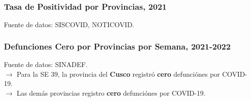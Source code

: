 \documentclass[xcolor=table]{beamer}
\begin{document}
	\begin{frame}
		\frametitle{Tasa de Positividad por Provincias, 2021}
		\vspace{-.5cm}
		
		\begin{table}[]
			\resizebox{\textwidth}{!}{%
				
			}
		\end{table}	
		{\tiny Fuente de datos: SISCOVID, NOTICOVID.}
		
	\end{frame}
	
	\begin{frame}
		\frametitle{Defunciones Cero por Provincias por Semana, 2021-2022}
		\vspace{-.5cm}
		
		\begin{table}[]
			\resizebox{\textwidth}{!}{%
				
			}
		\end{table}	
		{\tiny Fuente de datos: SINADEF. \\}
		\vspace{0.2cm}
		$\rightarrow$ Para la SE 39, la provincia del \textbf{\color{mycolor5}Cusco} registró \textbf{\color{mycolor5}cero} defunciónes por COVID-19.\\
		$\rightarrow$ Las demás provincias  registro \textbf{\color{mycolor5}cero} defunciónes por COVID-19.\\
	\end{frame}
	
\end{document}
